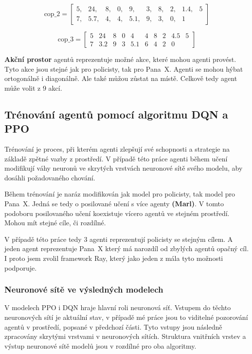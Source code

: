 \[
\text{cop\_2} = \begin{bmatrix}
5, & 24, & 8, & 0, & 9, & 3, & 8, & 2, & 1.4, & 5 \\
7, & 5.7, & 4, & 4, & 5.1, & 9, & 3, & 0, & 1
\end{bmatrix}
\]

\[
\text{cop\_3} = \begin{bmatrix}
5 & 24 & 8 & 0 & 4 & 4 & 8 & 2 & 4.5 & 5 \\
7 & 3.2 & 9 & 3 & 5.1 & 6 & 4 & 2 & 0
\end{bmatrix}
\]

\bigskip

\textbf{Akční prostor} agentů reprezentuje možné akce, které mohou agenti provést.
Tyto akce jsou stejné jak pro policisty, tak pro Pana~X\@.
Agenti se mohou hýbat ortogonálně i diagonálně.
Ale také můžou zůstat na místě.
Celkově tedy agent může volit z 9 akcí.

\subsection{Trénování agentů pomocí algoritmu DQN a PPO}
Trénování je proces, při kterém agenti zlepšují své schopnosti a strategie na základě zpětné vazby z prostředí.
V případě této práce agenti během učení modifikují váhy neuronů ve skrytých vrstvách neuronové sítě svého modelu, aby dosáhli požadovaného chování.

Během trénování je naráz modifikován jak model pro policisty, tak model pro Pana~X\@.
Jedná se tedy o posilované učení s více agenty \textbf{(Marl)}.
V tomto podoboru posilovaného učení koexistuje vícero agentů ve stejném prostředí.
Mohou mít stejné cíle, či rozdílné.

V případě této práce tedy 3 agenti reprezentují policisty se stejným cílem.
A jeden agent reprezentuje Pana~X který má narozdíl od zbylých agentů opačný cíl.
I proto jsem zvolil framework Ray, který jako jeden z mála tyto možnosti podporuje.

\subsubsection{Neuronové sítě ve výsledných modelech}
\label{subsec:neuronove_site}
V modelech PPO i DQN hraje hlavní roli neuronová síť.
Vstupem do těchto neuronových sítí je aktuální stav, v případě mé práce jsou to viditelné pozorování agentů v prostředí, popsané v předchozí části.
Tyto vstupy jsou následně zpracovány skrytými vrstvami v neuronových sítích.
Struktura vnitřních vrstev a výstup neuronové sítě modelů jsou v rozdílné pro oba algoritmy.
\bigskip

